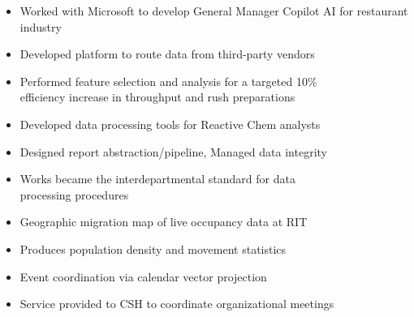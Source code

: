 \documentclass[10pt,a4paper,ragged2e,withhyper]{altacv}
\begin{document}
\begin{paracol}{2}


\begin{itemize}
    \item Worked with Microsoft to develop General Manager Copilot AI for restaurant industry
    \item Developed platform to route data from third-party vendors
    \item Performed feature selection and analysis for a targeted 10\%
        \\efficiency increase in throughput and rush preparations
\end{itemize}

\divider

\begin{itemize}
    \item Developed data processing tools for Reactive Chem analysts
    \item Designed report abstraction/pipeline, Managed data integrity
    \item Works became the interdepartmental standard for data\\processing procedures
\end{itemize}


\begin{itemize}
    \item Geographic migration map of live occupancy data at RIT
    \item Produces population density and movement statistics
\end{itemize}

\divider

\begin{itemize}
    \item Event coordination via calendar vector projection
    \item Service provided to CSH to coordinate organizational meetings
\end{itemize}


\end{paracol}
\end{document}
